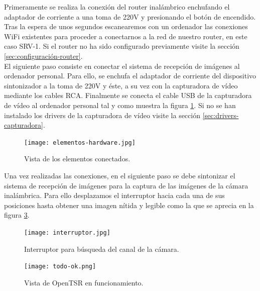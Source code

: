 Primeramente se realiza la conexión del router inalámbrico enchufando el adaptador de corriente a una toma de 220V y presionando el botón de encendido. Tras la espera de unos segundos escanearemos con un ordenador las conexiones WiFi existentes para proceder a conectarnos a la red de nuestro router, en este caso SRV-1. Si el router no ha sido configurado previamente visite la sección \ref{sec:configuración-router}.\\

El siguiente paso consiste en conectar el sistema de recepción de imágenes al ordenador personal. Para ello, se enchufa el adaptador de corriente del dispositivo sintonizador a la toma de 220V y éste, a su vez con la capturadora de vídeo mediante los cables RCA. Finalmente se conecta el cable USB de la capturadora de vídeo al ordenador personal tal y como muestra la figura \ref{fig:todo-conectado}. Si no se han instalado los drivers de la capturadora de vídeo visite la sección \ref{sec:drivers-capturadora}.\\

\begin{figure}[H]
  \begin{center}
    \texttt{[image: elementos-hardware.jpg]}
  \end{center}
  \caption{Vista de los elementos conectados.}
  \label{fig:todo-conectado}
\end{figure}


Una vez realizadas las conexiones, en el siguiente paso se debe sintonizar el sistema de recepción de imágenes para la captura de las imágenes de la cámara inalámbrica. Para ello desplazamos el interruptor hacia cada una de sus posiciones hasta obtener una imagen nítida y legible como la que se aprecia en la figura \ref{fig:im-ok}.\\

\begin{figure}[H]
  \begin{center}
    \texttt{[image: interruptor.jpg]}
  \end{center}
  \caption{Interruptor para búsqueda del canal de la cámara.}
  \label{fig:im-ok}
\end{figure}

\begin{figure}[H]
  \begin{center}
    \texttt{[image: todo-ok.png]}
  \end{center}
  \caption{Vista de OpenTSR en funcionamiento.}
  \label{fig:im-ok}
\end{figure}

